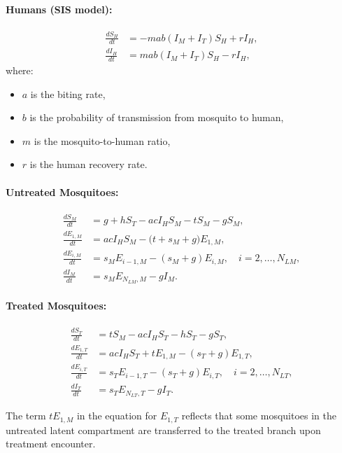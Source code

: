 \documentclass[12pt]{article}
\begin{document}
\paragraph{Humans (SIS model):}
\begin{align}
\frac{dS_H}{dt} &= - m a b (I_M + I_T) S_H + r I_H, \\
\frac{dI_H}{dt} &= m a b (I_M + I_T) S_H - r I_H,
\end{align}
where:
\begin{itemize}
    \item \(a\) is the biting rate,
    \item \(b\) is the probability of transmission from mosquito to human,
    \item \(m\) is the mosquito-to-human ratio,
    \item \(r\) is the human recovery rate.
\end{itemize}

\paragraph{Untreated Mosquitoes:}
\begin{align}
\frac{dS_M}{dt} &= g + h S_T - a c I_H S_M - tS_M - gS_M, \\
\frac{dE_{1,M}}{dt} &= a c I_H S_M - \Big( t + s_M + g \Big) E_{1,M}, \\
\frac{dE_{i,M}}{dt} &= s_M E_{i-1,M} - (s_M+g) E_{i,M}, \quad i=2,\dots,N_{LM}, \\
\frac{dI_M}{dt} &= s_M E_{N_{LM},M} - g I_M.
\end{align}

\paragraph{Treated Mosquitoes:}
\begin{align}
\frac{dS_T}{dt} &= t S_M - a c I_H S_T - h S_T - g S_T, \\
\frac{dE_{1,T}}{dt} &= a c I_H S_T + tE_{1,M} - (s_T + g) E_{1,T}, \\
\frac{dE_{i,T}}{dt} &= s_T E_{i-1,T} - (s_T+g)E_{i,T}, \quad i=2,\dots,N_{LT}, \\
\frac{dI_T}{dt} &= s_T E_{N_{LT},T} - g I_T.
\end{align}

The term \(tE_{1,M}\) in the equation for \(E_{1,T}\) reflects that some mosquitoes in the untreated latent compartment are transferred to the treated branch upon treatment encounter.
\end{document}
